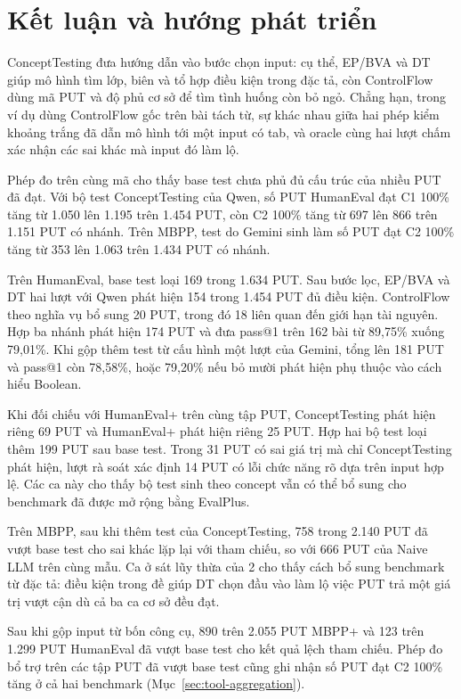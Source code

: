 \chapter*{Kết luận và hướng phát triển}
{}

ConceptTesting đưa hướng dẫn vào bước chọn input: cụ thể, EP/BVA và DT giúp mô hình tìm lớp, biên và tổ hợp điều kiện trong đặc tả, còn ControlFlow dùng mã PUT và độ phủ cơ sở để tìm tình huống còn bỏ ngỏ. Chẳng hạn, trong ví dụ dùng ControlFlow gốc trên bài tách từ, sự khác nhau giữa hai phép kiểm khoảng trắng đã dẫn mô hình tới một input có tab, và oracle cùng hai lượt chấm xác nhận các sai khác mà input đó làm lộ.

Phép đo trên cùng mã cho thấy base test chưa phủ đủ cấu trúc của nhiều PUT đã đạt. Với bộ test ConceptTesting của Qwen, số PUT HumanEval đạt C1 100\% tăng từ 1.050 lên 1.195 trên 1.454 PUT, còn C2 100\% tăng từ 697 lên 866 trên 1.151 PUT có nhánh. Trên MBPP, test do Gemini sinh làm số PUT đạt C2 100\% tăng từ 353 lên 1.063 trên 1.434 PUT có nhánh.

Trên HumanEval, base test loại 169 trong 1.634 PUT. Sau bước lọc, EP/BVA và DT hai lượt với Qwen phát hiện 154 trong 1.454 PUT đủ điều kiện. ControlFlow theo nghĩa vụ bổ sung 20 PUT, trong đó 18 liên quan đến giới hạn tài nguyên. Hợp ba nhánh phát hiện 174 PUT và đưa pass@1 trên 162 bài từ 89,75\% xuống 79,01\%. Khi gộp thêm test từ cấu hình một lượt của Gemini, tổng lên 181 PUT và pass@1 còn 78,58\%, hoặc 79,20\% nếu bỏ mười phát hiện phụ thuộc vào cách hiểu Boolean.

Khi đối chiếu với HumanEval+ trên cùng tập PUT, ConceptTesting phát hiện riêng 69 PUT và HumanEval+ phát hiện riêng 25 PUT. Hợp hai bộ test loại thêm 199 PUT sau base test. Trong 31 PUT có sai giá trị mà chỉ ConceptTesting phát hiện, lượt rà soát xác định 14 PUT có lỗi chức năng rõ dựa trên input hợp lệ. Các ca này cho thấy bộ test sinh theo concept vẫn có thể bổ sung cho benchmark đã được mở rộng bằng EvalPlus.

Trên MBPP, sau khi thêm test của ConceptTesting, 758 trong 2.140 PUT đã vượt base test cho sai khác lặp lại với tham chiếu, so với 666 PUT của Naive LLM trên cùng mẫu. Ca ở sát lũy thừa của 2 cho thấy cách bổ sung benchmark từ đặc tả: điều kiện trong đề giúp DT chọn đầu vào làm lộ việc PUT trả một giá trị vượt cận dù cả ba ca cơ sở đều đạt.

Sau khi gộp input từ bốn công cụ, 890 trên 2.055 PUT MBPP+ và 123 trên 1.299 PUT HumanEval đã vượt base test cho kết quả lệch tham chiếu. Phép đo bổ trợ trên các tập PUT đã vượt base test cũng ghi nhận số PUT đạt C2 100\% tăng ở cả hai benchmark (Mục~\ref{sec:tool-aggregation}).

